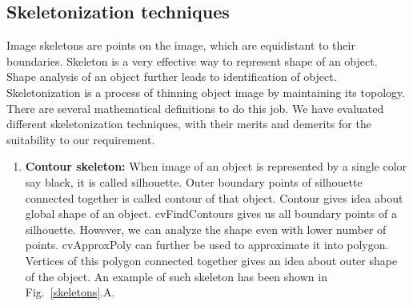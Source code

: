 \subsection{Skeletonization techniques}
\indent Image skeletons are points on the image, which are equidistant
to their boundaries.  Skeleton is a very effective way to represent
shape of an object.  Shape analysis of an object further leads to
identification of object.  Skeletonization is a process of thinning
object image by maintaining its topology. There are several mathematical
definitions to do this job. We have evaluated different skeletonization
techniques, with their merits and demerits for the suitability to our
requirement.
\begin{enumerate}
\item \textbf{Contour skeleton:} When image of an object is represented by
	a single color say black, it is called silhouette. Outer boundary
	points of silhouette connected together is called contour of
	that object. Contour gives idea about global shape of an object.
	cvFindContours gives us all boundary points of a silhouette.
	However, we can analyze the shape even with lower number of
	points. cvApproxPoly can further be used to approximate it into
	polygon. Vertices of this polygon connected together gives an
	idea about outer shape of the object. An example of such
	skeleton has been shown in Fig.~\ref{skeletons}.A.


\end{enumerate}
